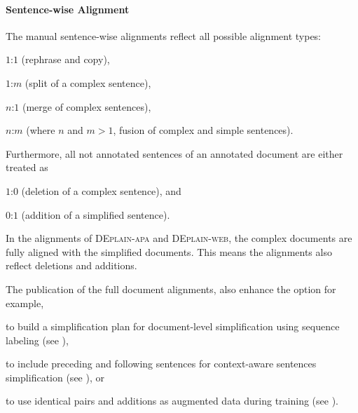 \documentclass[11pt]{article}
\begin{document}
\paragraph{Sentence-wise Alignment}
 The manual sentence-wise alignments reflect all possible alignment types: 
\begin{enumerate*}[label=\roman*)]
    \item $1$:$1$ (rephrase and copy), 
    \item $1$:$m$ (split of a complex sentence), 
    \item $n$:$1$ (merge of complex sentences), 
    \item $n$:$m$ (where $n$ and $m>1$, fusion of complex and simple sentences).
\end{enumerate*}
Furthermore, all not annotated sentences of an annotated document are either treated as 
\begin{enumerate*}[label=\roman*)]
  \setcounter{enumi}{4}
    \item $1$:$0$ (deletion of a complex sentence), and 
    \item $0$:$1$ (addition of a simplified sentence).
\end{enumerate*}\par
In the alignments of \textsc{DEplain-apa} and \textsc{DEplain-web}, the complex documents are fully aligned with the simplified documents. This means the alignments also reflect deletions  and additions.

The publication of the full document alignments, also enhance the option for example, 
\begin{enumerate*}[label=\roman*)]
    \item to build a simplification plan for document-level simplification using sequence labeling (see \citealt{cripwell-etal-2023-document}), 
    \item to include preceding and following sentences for context-aware sentences simplification (see \citealt{sun-etal-2020-helpfulness}), or 
    \item to use identical pairs and additions as augmented data during training (see \citealt{palmero-aprosio-etal-2019-neural}).
\end{enumerate*}
\end{document}
